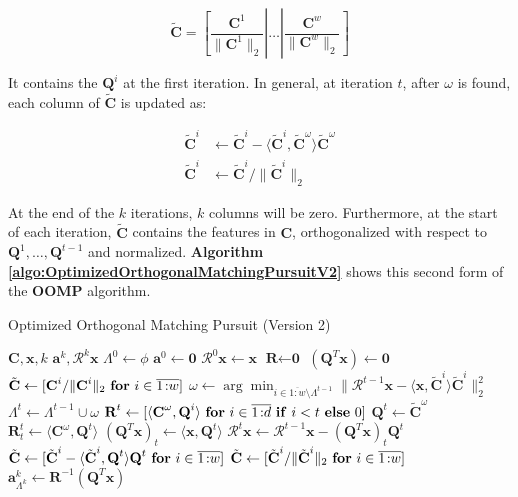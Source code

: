 \documentclass[12pt,a4paper,oneside,english]{UPBThesis}
\newcommand{\hcrange}[2]{\overline{{#1}\colon\!\!{#2}}}
\begin{document}
\begin{equation*}
\tilde{\textbf{C}} = \left[ \frac{\textbf{C}^1}{\|\textbf{C}^1\|_2} \left|\right. \dots \left|\right. \frac{\textbf{C}^w}{\|\textbf{C}^w\|_2} \right]
\end{equation*}

It contains the $\textbf{Q}^i$ at the first iteration. In general, at iteration $t$, after $\omega$ is found, each column of $\tilde{\textbf{C}}$ is updated as:

\begin{align*}
\tilde{\textbf{C}}^i & \gets \tilde{\textbf{C}}^i - \langle \tilde{\textbf{C}}^i, \tilde{\textbf{C}}^\omega \rangle \tilde{\textbf{C}}^\omega \\
\tilde{\textbf{C}}^i & \gets \tilde{\textbf{C}}^i / \| \tilde{\textbf{C}}^i \|_2
\end{align*}

At the end of the $k$ iterations, $k$ columns will be zero. Furthermore, at the start of each iteration, $\tilde{\textbf{C}}$ contains the features in $\textbf{C}$, orthogonalized with respect to $\textbf{Q}^1, \dots, \textbf{Q}^{t-1}$ and normalized. \textbf{Algorithm \ref{algo:OptimizedOrthogonalMatchingPursuitV2}} shows this second form of the \textbf{OOMP} algorithm.

\begin{algorithm}
\caption{Optimized Orthogonal Matching Pursuit (Version 2)}
\label{algo:OptimizedOrthogonalMatchingPursuitV2}
\begin{algorithmic}
\Require $\textbf{C},\textbf{x},k$
\Ensure $\textbf{a}^k,\mathcal{R}^k\textbf{x}$
\State $\Lambda^0 \gets \phi$
\State $\textbf{a}^0 \gets \textbf{0}$
\State $\mathcal{R}^0\textbf{x} \gets \textbf{x}$
\State $\textbf{R} \gets \textbf{0}$
\State $(\textbf{Q}^T\textbf{x}) \gets \textbf{0}$
\State $\tilde{\textbf{C}} \gets [ \textbf{C}^i / \|\textbf{C}^i\|_2 ~ \mbox{\textbf{for} $i \in \hcrange{1}{w}$} ]$
\For {$t = \hcrange{1}{k}$}
\State $\omega \gets \arg\min_{i \in \hcrange{1}{w} \setminus \Lambda^{t-1}} \| \mathcal{R}^{t-1}\textbf{x} - \langle \textbf{x}, \tilde{\textbf{C}}^i \rangle \tilde{\textbf{C}}^i \|_2^2$  
\State $\Lambda^t \gets \Lambda^{t-1} \cup \omega$
\State $\textbf{R}^t \gets [ \langle \textbf{C}^\omega, \textbf{Q}^i \rangle~\mbox{\textbf{for} $i \in \hcrange{1}{d}$ \textbf{if} $i < t$ \textbf{else} $0$} ]$ 
\State $\textbf{Q}^t \gets \tilde{\textbf{C}}^\omega$
\State $\textbf{R}^t_t \gets \langle \textbf{C}^\omega, \textbf{Q}^t \rangle$
\State $(\textbf{Q}^T\textbf{x})_t \gets \langle \textbf{x}, \textbf{Q}^t \rangle$
\State $\mathcal{R}^t\textbf{x} \gets \mathcal{R}^{t-1}\textbf{x} -  (\textbf{Q}^T\textbf{x})_t \textbf{Q}^t$
\State $\tilde{\textbf{C}} \gets [ \tilde{\textbf{C}}^i - \langle \tilde{\textbf{C}}^i, \textbf{Q}^t \rangle \textbf{Q}^t ~ \mbox{\textbf{for} $i \in \hcrange{1}{w}$} ]$
\State $\tilde{\textbf{C}} \gets [ \tilde{\textbf{C}}^i / \| \tilde{\textbf{C}}^i \|_2 ~ \mbox{\textbf{for} $i \in \hcrange{1}{w}$} ]$
\EndFor
\State $\textbf{a}_{\Lambda^k}^k \gets \textbf{R}^{-1}(\textbf{Q}^T\textbf{x})$
\end{algorithmic}
\end{algorithm}
\end{document}
